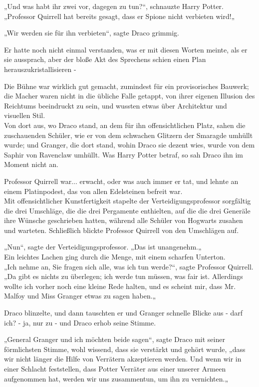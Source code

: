 {„Und was habt ihr zwei vor, dagegen zu tun?“, schnauzte Harry Potter. „Professor Quirrell hat bereits gesagt, dass er Spione nicht verbieten wird!„

„Wir werden sie für ihn verbieten“, sagte Draco grimmig.

Er hatte noch nicht einmal verstanden, was er mit diesen Worten meinte, als er sie aussprach, aber der bloße Akt des Sprechens schien einen Plan herauszukristallisieren -

Die Bühne war wirklich gut gemacht, zumindest für ein provisorisches Bauwerk; die Macher waren nicht in die übliche Falle getappt, von ihrer eigenen Illusion des Reichtums beeindruckt zu sein, und wussten etwas über Architektur und visuellen Stil.\\ Von dort aus, wo Draco stand, an dem für ihn offensichtlichen Platz, sahen die zuschauenden Schüler, wie er von dem schwachen Glitzern der Smaragde umhüllt wurde; und Granger, die dort stand, wohin Draco sie dezent wies, wurde von dem Saphir von Ravenclaw umhüllt. Was Harry Potter betraf, so sah Draco ihn im Moment nicht an.

Professor Quirrell war... erwacht, oder was auch immer er tat, und lehnte an einem Platinpodest, das von allen Edelsteinen befreit war.\\ Mit offensichtlicher Kunstfertigkeit stapelte der Verteidigungsprofessor sorgfältig die drei Umschläge, die die drei Pergamente enthielten, auf die die drei Generäle ihre Wünsche geschrieben hatten, während alle Schüler von Hogwarts zusahen und warteten. Schließlich blickte Professor Quirrell von den Umschlägen auf.

„Nun“, sagte der Verteidigungsprofessor. „Das ist unangenehm.„\\ Ein leichtes Lachen ging durch die Menge, mit einem scharfen Unterton.\\ „Ich nehme an, Sie fragen sich alle, was ich tun werde?“, sagte Professor Quirrell.\\ „Da gibt es nichts zu überlegen; ich werde tun müssen, was fair ist. Allerdings wollte ich vorher noch eine kleine Rede halten, und es scheint mir, dass Mr. Malfoy und Miss Granger etwas zu sagen haben.„

Draco blinzelte, und dann tauschten er und Granger schnelle Blicke aus - darf ich? - ja, nur zu - und Draco erhob seine Stimme.

„General Granger und ich möchten beide sagen“, sagte Draco mit seiner förmlichsten Stimme, wohl wissend, dass sie verstärkt und gehört wurde, „dass wir nicht länger die Hilfe von Verrätern akzeptieren werden. Und wenn wir in einer Schlacht feststellen, dass Potter Verräter aus einer unserer Armeen aufgenommen hat, werden wir uns zusammentun, um ihn zu vernichten.„

}

